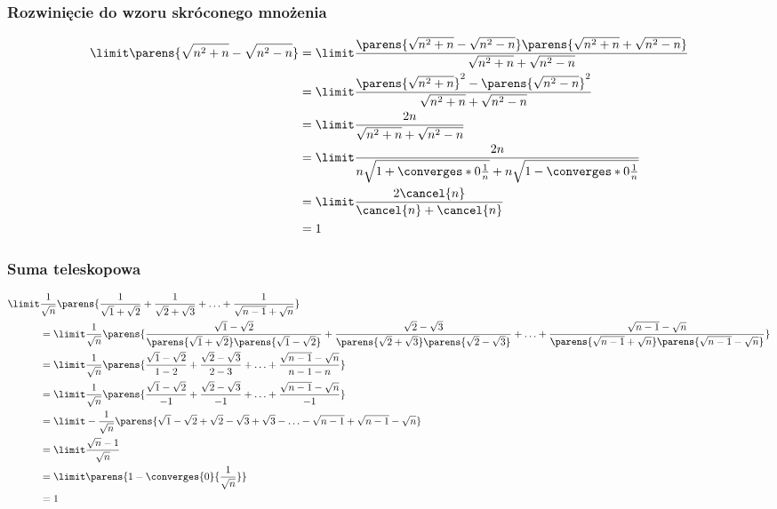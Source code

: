 \subsubsection*{Rozwinięcie do wzoru skróconego mnożenia}
\begin{equation*}
    \begin{split}
        \limit \parens{\sqrt{n^2 + n} - \sqrt{n^2 - n}} &= \limit \frac{\parens{\sqrt{n^2 + n} - \sqrt{n^2 - n}}\parens{\sqrt{n^2 + n} + \sqrt{n^2 - n}}}{\sqrt{n^2 + n} + \sqrt{n^2 - n}}\\
            &= \limit \frac{\parens{\sqrt{n^2 + n}}^2 - \parens{\sqrt{n^2 - n}}^2}{\sqrt{n^2 + n} + \sqrt{n^2 - n}}\\
            &= \limit \frac{2n}{\sqrt{n^2 + n} + \sqrt{n^2 - n}}\\
            &= \limit \frac{2n}{n\sqrt{1 + \converges*{0}{\frac{1}{n}}} + n\sqrt{1 - \converges*{0}{\frac{1}{n}}}}\\
            &= \limit \frac{2\cancel{n}}{\cancel{n} + \cancel{n}}\\
            &= 1
    \end{split}
\end{equation*}
\subsubsection*{Suma teleskopowa}
\begin{equation*}
    \begin{split}
        \limit &\frac{1}{\sqrt{n}}\parens{\frac{1}{\sqrt{1}+\sqrt{2}} + \frac{1}{\sqrt{2}+\sqrt{3}} + \ldots + \frac{1}{\sqrt{n-1}+\sqrt{n}}}\\
        &= \limit \frac{1}{\sqrt{n}}\parens{\frac{\sqrt{1}-\sqrt{2}}{\parens{\sqrt{1}+\sqrt{2}}\parens{\sqrt{1}-\sqrt{2}}} + \frac{\sqrt{2}-\sqrt{3}}
            {\parens{\sqrt{2}+\sqrt{3}}\parens{\sqrt{2}-\sqrt{3}}} + \ldots + \frac{\sqrt{n-1}-\sqrt{n}}{\parens{\sqrt{n-1}+\sqrt{n}}\parens{\sqrt{n-1}
            -\sqrt{n}}}}\\
        &= \limit \frac{1}{\sqrt{n}}\parens{\frac{\sqrt{1}-\sqrt{2}}{1 - 2} + \frac{\sqrt{2}-\sqrt{3}}{2 - 3} + \ldots + \frac{\sqrt{n-1}-\sqrt{n}}
            {n-1-n}}\\
        &= \limit \frac{1}{\sqrt{n}}\parens{\frac{\sqrt{1}-\sqrt{2}}{-1} + \frac{\sqrt{2}-\sqrt{3}}{-1} + \ldots + \frac{\sqrt{n-1}-\sqrt{n}}{-1}}\\
        &= \limit -\frac{1}{\sqrt{n}}\parens{\sqrt{1} - \sqrt{2} + \sqrt{2} - \sqrt{3} + \sqrt{3} - \ldots - \sqrt{n-1} + \sqrt{n-1} - \sqrt{n}}\\
        &= \limit \frac{\sqrt{n} - 1}{\sqrt{n}}\\
        &= \limit \parens{1 - \converges{0}{\frac{1}{\sqrt{n}}}}\\
        &= 1
    \end{split}
\end{equation*}
